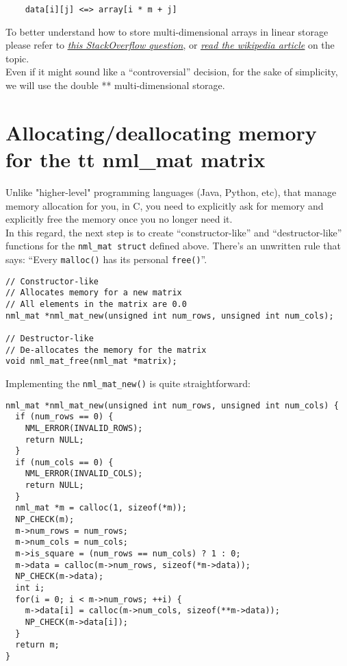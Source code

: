 \begin{verbatim}
    data[i][j] <=> array[i * m + j]
\end{verbatim}

To better understand how to store multi-dimensional arrays in linear storage please refer to \href{https://stackoverflow.com/questions/14015556/how-to-map-the-indexes-of-a-matrix-to-a-1-dimensional-array-c}{\underline{\it this StackOverflow question}}, or \href{https://en.wikipedia.org/wiki/Row-_and_column-major_order}{\underline{\it read the wikipedia article}} on the topic.
\\

Even if it might sound like a “controversial” decision, for the sake of simplicity, we will use the double ** multi-dimensional storage.

\section{Allocating/deallocating memory for the {tt nml\_mat} matrix}

Unlike "higher-level" programming languages (Java, Python, etc), that manage memory allocation for you, in C, you need to explicitly ask for memory and explicitly free the memory once you no longer need it.
\\

In this regard, the next step is to create ``constructor-like'' and “destructor-like” functions for the {\tt nml\_mat struct} defined above. There’s an unwritten rule that says: ``Every {\tt malloc()} has its personal {\tt free()}''.

\begin{verbatim}
// Constructor-like 
// Allocates memory for a new matrix
// All elements in the matrix are 0.0
nml_mat *nml_mat_new(unsigned int num_rows, unsigned int num_cols);

// Destructor-like
// De-allocates the memory for the matrix
void nml_mat_free(nml_mat *matrix);
\end{verbatim}

Implementing the {\tt nml\_mat\_new()} is quite straightforward:

\begin{verbatim}
nml_mat *nml_mat_new(unsigned int num_rows, unsigned int num_cols) {
  if (num_rows == 0) {
    NML_ERROR(INVALID_ROWS);
    return NULL;
  }
  if (num_cols == 0) {
    NML_ERROR(INVALID_COLS);
    return NULL;
  }
  nml_mat *m = calloc(1, sizeof(*m));
  NP_CHECK(m);
  m->num_rows = num_rows;
  m->num_cols = num_cols;
  m->is_square = (num_rows == num_cols) ? 1 : 0;
  m->data = calloc(m->num_rows, sizeof(*m->data));
  NP_CHECK(m->data);
  int i;
  for(i = 0; i < m->num_rows; ++i) {
    m->data[i] = calloc(m->num_cols, sizeof(**m->data));
    NP_CHECK(m->data[i]);
  }
  return m;
}
\end{verbatim}

